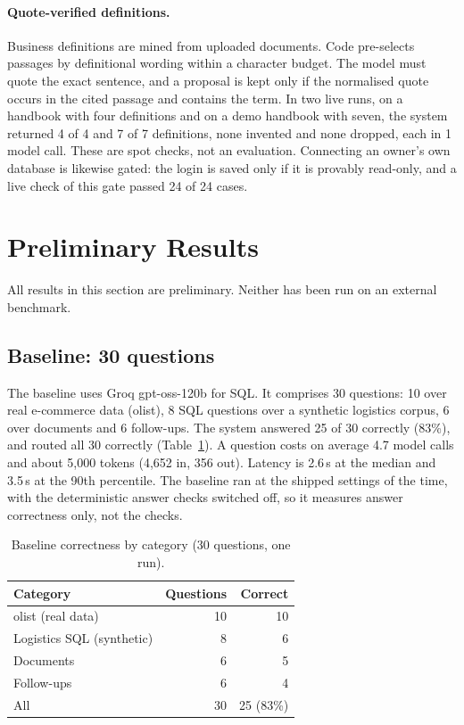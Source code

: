 \documentclass[10pt,twocolumn]{article}
\begin{document}
\paragraph{Quote-verified definitions.} Business definitions are mined from uploaded documents. Code pre-selects passages by definitional wording within a character budget. The model must quote the exact sentence, and a proposal is kept only if the normalised quote occurs in the cited passage and contains the term. In two live runs, on a handbook with four definitions and on a demo handbook with seven, the system returned 4 of 4 and 7 of 7 definitions, none invented and none dropped, each in 1 model call. These are spot checks, not an evaluation. Connecting an owner's own database is likewise gated: the login is saved only if it is provably read-only, and a live check of this gate passed 24 of 24 cases.

\section{Preliminary Results}\label{sec:results}
All results in this section are preliminary. Neither has been run on an external benchmark.

\subsection{Baseline: 30 questions}
The baseline uses Groq gpt-oss-120b for SQL. It comprises 30 questions: 10 over real e-commerce data (olist), 8 SQL questions over a synthetic logistics corpus, 6 over documents and 6 follow-ups. The system answered 25 of 30 correctly (83\%), and routed all 30 correctly (Table~\ref{tab:baseline}). A question costs on average 4.7 model calls and about 5,000 tokens (4,652 in, 356 out). Latency is 2.6\,s at the median and 3.5\,s at the 90th percentile. The baseline ran at the shipped settings of the time, with the deterministic answer checks switched off, so it measures answer correctness only, not the checks.

\begin{table}[t]
\centering\small
\caption{Baseline correctness by category (30 questions, one run).}\label{tab:baseline}
\begin{tabular}{@{}lrr@{}}
\toprule
Category & Questions & Correct \\
\midrule
olist (real data) & 10 & 10 \\
Logistics SQL (synthetic) & 8 & 6 \\
Documents & 6 & 5 \\
Follow-ups & 6 & 4 \\
\midrule
All & 30 & 25 (83\%) \\
\bottomrule
\end{tabular}
\end{table}
\end{document}
